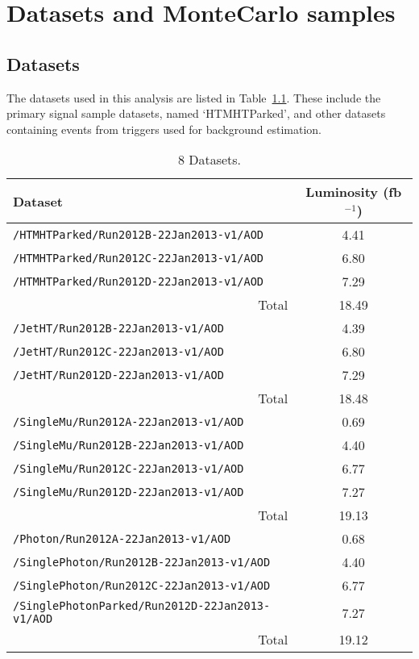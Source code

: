 \chapter{Datasets and MonteCarlo samples}
\label{ch:5_2}

\ifpdf
    \graphicspath{{Chapter5_2/Figs/Raster/}{Chapter5_2/Figs/PDF/}{Chapter5_2/Figs/}}
\else
    \graphicspath{{Chapter5_2/Figs/Vector/}{Chapter5_2/Figs/}}
\fi

\section{Datasets}

The datasets used in this analysis are listed in Table~\ref{tab:datasets}. These
include the primary signal sample datasets, named `HTMHTParked', and other
datasets containing events from triggers used for background estimation.

\begin{table}[ht]
  \caption{8 \tev Datasets.}
  \label{tab:datasets}
  \centering
  \scriptsize
  \begin{tabular}{ lc }
    \hline
    \hline
    Dataset & Luminosity (fb$^{-1}$) \\
    \hline
    \verb!/HTMHTParked/Run2012B-22Jan2013-v1/AOD! & 4.41 \\
    \verb!/HTMHTParked/Run2012C-22Jan2013-v1/AOD! & 6.80 \\
    \verb!/HTMHTParked/Run2012D-22Jan2013-v1/AOD! & 7.29 \\
    \multicolumn{1}{r}{Total} & 18.49 \\ [0.5ex]
    \verb!/JetHT/Run2012B-22Jan2013-v1/AOD! & 4.39 \\
    \verb!/JetHT/Run2012C-22Jan2013-v1/AOD! & 6.80 \\
    \verb!/JetHT/Run2012D-22Jan2013-v1/AOD! & 7.29 \\
    \multicolumn{1}{r}{Total} & 18.48 \\ [0.5ex]
    \verb!/SingleMu/Run2012A-22Jan2013-v1/AOD! & 0.69 \\
    \verb!/SingleMu/Run2012B-22Jan2013-v1/AOD! & 4.40 \\
    \verb!/SingleMu/Run2012C-22Jan2013-v1/AOD! & 6.77 \\
    \verb!/SingleMu/Run2012D-22Jan2013-v1/AOD! & 7.27 \\
    \multicolumn{1}{r}{Total} & 19.13 \\ [0.5ex] %
    \verb!/Photon/Run2012A-22Jan2013-v1/AOD! & 0.68 \\
    \verb!/SinglePhoton/Run2012B-22Jan2013-v1/AOD! & 4.40 \\
    \verb!/SinglePhoton/Run2012C-22Jan2013-v1/AOD! & 6.77 \\
    \verb!/SinglePhotonParked/Run2012D-22Jan2013-v1/AOD! & 7.27 \\
    \multicolumn{1}{r}{Total} & 19.12 \\ [0.5ex] %
    \hline
    \hline
  \end{tabular}
\end{table}


